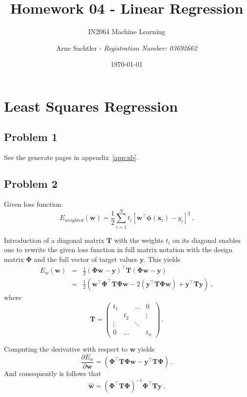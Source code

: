 \documentclass{scrartcl}
\title{Homework 04 - Linear Regression}
\author{Arne Sachtler - \textit{Registration Number: 03692662}}
\date{\today}
\subtitle{IN2064 Machine Learning}
\begin{document}
\maketitle

\section{Least Squares Regression}

\subsection{Problem 1}

See the generate pages in appendix~\ref{app:nb}.

\subsection{Problem 2}

Given loss function:
\begin{equation}
	E_{weighted}(\mathbf{w}) = \frac{1}{2} \sum_{i=1}^{N} t_i \left[\mathbf{w}^\top \mathbf{\phi}(\mathbf{x}_i) - y_i\right]^2 \, .
\end{equation}

Introduction of a diagonal matrix $\mathbf{T}$ with the weights $t_i$ on its diagonal enables one to rewrite the given loss function in full matrix notation with the design matrix $\mathbf{\Phi}$ and the full vector of target values $\mathbf{y}$. This yields
\begin{eqnarray}\label{tt}
	E_{w}(\mathbf{w})&=&\frac{1}{2} \left(\mathbf{\Phi}\mathbf{w} - \mathbf{y}\right)^\top \mathbf{T} \left(\mathbf{\Phi \mathbf{w} - \mathbf{y}}\right) \\
	&=& \frac{1}{2}\left(\mathbf{w}^\top \mathbf{\Phi}^\top \mathbf{T} \mathbf{\Phi} \mathbf{w} - 2 \left(\mathbf{y}^\top \mathbf{T} \mathbf{\Phi} \mathbf{w}\right) + \mathbf{y}^\top \mathbf{T} \mathbf{y}\right) \, ,
\end{eqnarray}
where
\begin{equation}
	\mathbf{T} = \begin{pmatrix}
		t_1&&\ldots&0\\&t_2&&\vdots\\\vdots&&\ddots&\\0&\ldots&&t_n
	\end{pmatrix} \, .
\end{equation}

Computing the derivative with respect to $\mathbf{w}$ yields
\begin{equation}
	\frac{\partial E_w}{\partial \mathbf{w}} = \left(\mathbf{\Phi}^\top \mathbf{T} \mathbf{\Phi} \mathbf{w} - \mathbf{y}^\top \mathbf{T} \mathbf{\Phi}\right) \, .
\end{equation}
And consequently is follows that
\begin{equation}
	\hat{\mathbf{w}} = \left(\mathbf{\Phi}^\top \mathbf{T} \mathbf{\Phi}\right)^{-1} \mathbf{\Phi}^\top \mathbf{T} \mathbf{y} \, .
\end{equation}
\end{document}
